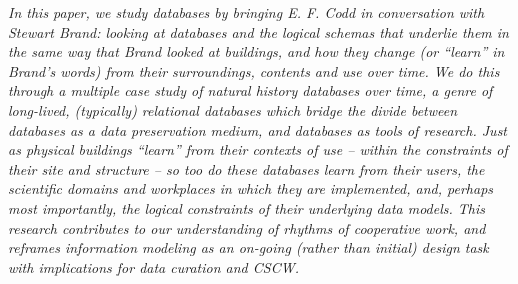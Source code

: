 \textit{In this paper, we study databases by bringing E. F. Codd in conversation with Stewart Brand: looking at databases and the logical schemas that underlie them in the same way that Brand looked at buildings, and how they change (or “learn” in Brand’s words) from their surroundings, contents and use over time.  We do this through a multiple case study of natural history databases over time, a genre of long-lived, (typically) relational databases which bridge the divide between databases as a data preservation medium, and databases as tools of research.  Just as physical buildings “learn” from their contexts of use – within the constraints of their site and structure – so too do these databases learn from their users, the scientific domains and workplaces in which they are implemented, and, perhaps most importantly, the logical constraints of their underlying data models.  This research contributes to our understanding of rhythms of cooperative work, and reframes information modeling as an on-going (rather than initial) design task with implications for data curation and CSCW.}